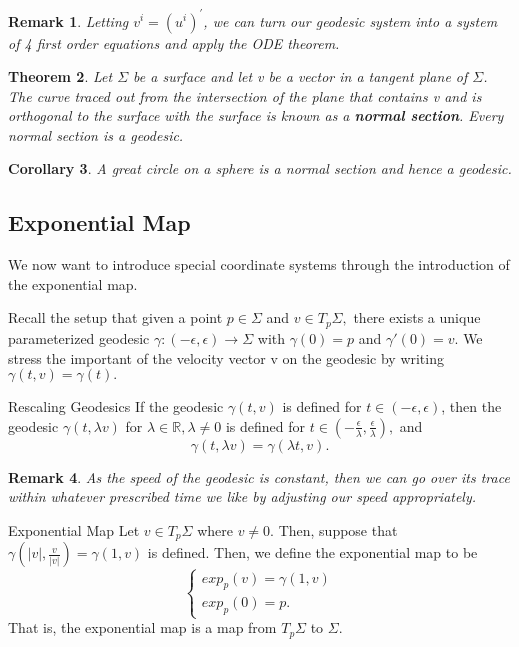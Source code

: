 \documentclass[twoside]{article}
\newcounter{lecnum}
\newtheorem{theorem}{Theorem}[lecnum]
\newtheorem{corollary}[theorem]{Corollary}
\newtheorem{remark}[theorem]{Remark}
\begin{document}
\begin{remark}Letting $v^i = (u^i)^{'}$, we can turn our geodesic system into a system of 4 first order equations and apply the ODE theorem.
\end{remark}

\begin{theorem}Let $\Sigma$ be a surface and let v be a vector in a tangent plane of $\Sigma$. The curve traced out from the intersection of the plane that contains v and is orthogonal to the surface with the surface is known as a \textbf{normal section}. Every normal section is a geodesic.
\end{theorem}

\begin{corollary}A great circle on a sphere is a normal section and hence a geodesic.
\end{corollary}

\subsection{Exponential Map}
We now want to introduce special coordinate systems through the introduction of the exponential map.

Recall the setup that given a point $p \in \Sigma$ and $v \in T_p\Sigma,$ there exists a unique parameterized geodesic $\gamma: (-\epsilon, \epsilon) \rightarrow \Sigma$ with $\gamma(0) = p$ and $\gamma'(0) = v.$ We stress the important of the velocity vector v on the geodesic by writing $\gamma(t,v) = \gamma(t).$

\begin{theorem_exam}{Rescaling Geodesics}{} If the geodesic $\gamma(t,v)$ is defined for $t \in (-\epsilon, \epsilon)$, then the geodesic $\gamma(t, \lambda v)$ for $\lambda \in \mathbb{R}, \lambda \neq 0$ is defined for $t \in (-\frac{\epsilon}{\lambda}, \frac{\epsilon}{\lambda}),$ and 
$$
\gamma(t, \lambda v) = \gamma(\lambda t, v).
$$
\end{theorem_exam}

\begin{remark}As the speed of the geodesic is constant, then we can go over its trace within whatever prescribed time we like by adjusting our speed appropriately. 
\end{remark}

\begin{definition_exam}{Exponential Map}{} Let $v \in T_p\Sigma$ where $v \neq 0$. Then, suppose that $\gamma(|v|, \frac{v}{|v|}) = \gamma(1,v)$ is defined. Then, we define the exponential map to be 
$$
\begin{cases}
exp_p(v) = \gamma(1,v)\\
exp_p(0) = p.
\end{cases}
$$
That is, the exponential map is a map from $T_p\Sigma$ to $\Sigma.$
\end{definition_exam}
\end{document}
